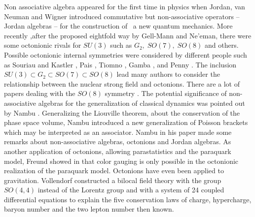 \documentclass[a4paper,12pt]{book}
\begin{document}
Non associative algebra appeared for the first time in physics when Jordan,
van Neuman and Wigner introduced commutative but non-associative operators
-- Jordan algebras -- for the construction of \ a new quantum mechanics\cite
{c1}. More recently ,after the proposed eightfold way by Gell-Mann and
Ne'eman, there were some octonionic rivals for $SU\left( 3\right) $ such as $%
G_{2},\;SO\left( 7\right) ,\;SO\left( 8\right) $ and others\cite{c2}.
Possible octonionic internal symmetries were considered by different people
such as Souriau and Kastler \cite{c3}, Pais \cite{c4}, Tiomno \cite{c5},
Gamba \cite{c6}, and Penny \cite{c7}. The inclusion $SU\left( 3\right)
\subset G_{2}\subset SO\left( 7\right) \subset SO\left( 8\right) $ lead many
authors to consider the relationship between the nuclear strong field and
octonions. There are a lot of papers dealing with the $SO\left( 8\right) $
symmetry \cite{c8}. The potential significance of non-associative algebras
for the generalization of classical dynamics was pointed out by Nambu \cite
{c9}. Generalizing the Liouville theorem, about the conservation of the
phase space volume, Nambu introduced a new generalization of Poisson
brackets which may be interpreted as an associator. Nambu in his paper made
some remarks about non-associative algebras, octonions and Jordan algebras.
As another application of octonions, allowing parastatistics and the
paraquark model, Freund showed in \cite{c9a} that color gauging is only
possible in the octonionic realization of the paraquark model. Octonions
have even been applied to gravitation. Vollendorf \cite{vollendorf}
constructed a bilocal field theory with the group $SO\left( 4,4\right) $
instead of the Lorentz group and with a system of 24 coupled differential
equations to explain the five conservation laws of charge, hypercharge,
baryon number and the two lepton number then known.
\end{document}
